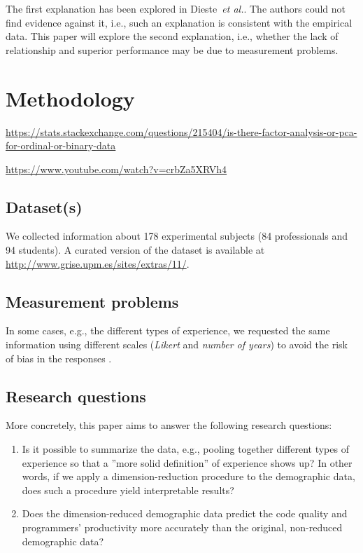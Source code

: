 \documentclass[10pt,conference]{IEEEtran}\usepackage[]{graphicx}\usepackage[table,xcdraw]{xcolor}
\newcommand{\etal}[0]{~\textit{et al.}}
\begin{document}
The first explanation has been explored in Dieste\etal \cite{dieste2018empirical}. The authors could not find evidence against it, i.e., such an explanation is consistent with the empirical data. This paper will explore the second explanation, i.e., whether the lack of relationship and superior performance may be due to measurement problems.

\section{Methodology}

\url{https://stats.stackexchange.com/questions/215404/is-there-factor-analysis-or-pca-for-ordinal-or-binary-data}

\url{https://www.youtube.com/watch?v=crbZa5XRVh4}

\subsection{Dataset(s)}\label{sec:dataset}

We collected information about 178 experimental subjects (84 professionals and 94 students). A curated version of the dataset is available at \url{http://www.grise.upm.es/sites/extras/11/}.

\subsection{Measurement problems}

\color{red}

In some cases, e.g., the different types of experience, we requested the same information using different scales (\textit{Likert} and \textit{number of years}) to avoid the risk of bias in the responses \cite{aranda2014evidence}.

\color{black}

\subsection{Research questions}

More concretely, this paper aims to answer the following research questions:

\begin{enumerate}[label=\textbf{RQ\arabic*.~}, align=left]
    \item Is it possible to summarize the data, e.g., pooling together different types of experience so that a ''more solid definition'' of experience shows up? In other words, if we apply a dimension-reduction procedure to the demographic data, does such a procedure yield interpretable results?

    \item Does the dimension-reduced demographic data predict the code quality and programmers' productivity more accurately than the original, non-reduced demographic data?
\end{enumerate}
\end{document}
